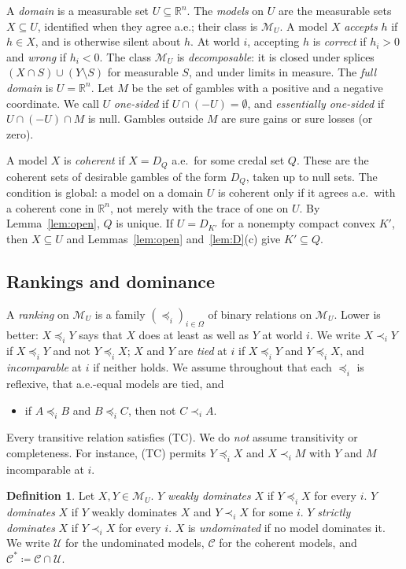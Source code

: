 \documentclass[11pt]{article}
\newcommand{\R}{\mathbb{R}}
\newcommand{\M}{\mathcal{M}}
\theoremstyle{plain}
\theoremstyle{definition}
\newtheorem{definition}[theorem]{Definition}
\theoremstyle{remark}
\begin{document}
A \emph{domain} is a measurable set $U\subseteq\R^n$. The \emph{models} on $U$ are the
measurable sets $X\subseteq U$, identified when they agree a.e.; their class is $\M_U$. A
model $X$ \emph{accepts} $h$ if $h\in X$, and is otherwise silent about $h$. At world $i$,
accepting $h$ is \emph{correct} if $h_i>0$ and \emph{wrong} if $h_i<0$. The class $\M_U$ is
\emph{decomposable}: it is closed under splices $(X\cap S)\cup(Y\setminus S)$ for measurable
$S$, and under limits in measure. The \emph{full domain} is $U=\R^n$. Let $M$ be the set of
gambles with a positive and a negative coordinate. We call $U$ \emph{one-sided} if
$U\cap(-U)=\emptyset$, and \emph{essentially one-sided} if $U\cap(-U)\cap M$ is null.
Gambles outside $M$ are sure gains or sure losses (or zero).

A model $X$ is \emph{coherent} if $X=D_Q$ a.e.\ for some credal set $Q$. These are the
coherent sets of desirable gambles of the form $D_Q$, taken up to null sets. The
condition is global: a model on a domain $U$ is coherent only if it agrees a.e.\ with a
coherent cone in $\R^n$, not merely with the trace of one on $U$. By
Lemma~\ref{lem:open}, $Q$ is unique. If $U=D_{K'}$ for a nonempty compact convex $K'$, then
$X\subseteq U$ and Lemmas~\ref{lem:open} and~\ref{lem:D}(c) give $K'\subseteq Q$.

\subsection{Rankings and dominance}

A \emph{ranking} on $\M_U$ is a family $(\preceq_i)_{i\in\Omega}$ of binary relations on
$\M_U$. Lower is better: $X\preceq_iY$ says that $X$ does at least as well as $Y$ at world
$i$. We write $X\prec_iY$ if $X\preceq_iY$ and not $Y\preceq_iX$; $X$ and $Y$ are
\emph{tied} at $i$ if $X\preceq_iY$ and $Y\preceq_iX$, and \emph{incomparable} at $i$ if
neither holds. We assume throughout that each $\preceq_i$ is reflexive, that a.e.-equal
models are tied, and
\begin{itemize}
  \item[(TC)] if $A\preceq_iB$ and $B\preceq_iC$, then not $C\prec_iA$.
\end{itemize}
Every transitive relation satisfies (TC). We do \emph{not} assume transitivity or
completeness. For instance, (TC) permits $Y\preceq_iX$ and $X\prec_iM$ with $Y$ and $M$
incomparable at $i$.

\begin{definition}\label{def:dom}
Let $X,Y\in\M_U$. $Y$ \emph{weakly dominates} $X$ if $Y\preceq_iX$ for every $i$. $Y$
\emph{dominates} $X$ if $Y$ weakly dominates $X$ and $Y\prec_iX$ for some $i$. $Y$
\emph{strictly dominates} $X$ if $Y\prec_iX$ for every $i$. $X$ is \emph{undominated} if
no model dominates it. We write $\mathcal U$ for the undominated models, $\mathcal C$ for
the coherent models, and $\mathcal C^\ast\coloneqq\mathcal C\cap\mathcal U$.
\end{definition}
\end{document}
